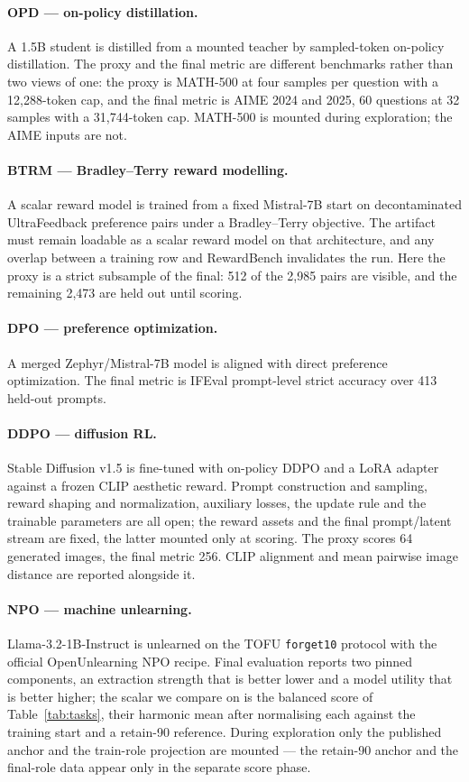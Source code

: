 \paragraph{OPD --- on-policy distillation.}
A 1.5B student is distilled from a mounted teacher by sampled-token on-policy distillation. The
proxy and the final metric are different benchmarks rather than two views of one: the proxy is
MATH-500 at four samples per question with a 12,288-token cap, and the final metric is AIME 2024 and
2025, 60 questions at 32 samples with a 31,744-token cap. MATH-500 is mounted during exploration;
the AIME inputs are not.

\paragraph{BTRM --- Bradley--Terry reward modelling.}
A scalar reward model is trained from a fixed Mistral-7B start on decontaminated UltraFeedback
preference pairs under a Bradley--Terry objective. The artifact must remain loadable as a scalar
reward model on that architecture, and any overlap between a training row and RewardBench
invalidates the run. Here the proxy is a strict subsample of the final: 512 of the 2,985 pairs are
visible, and the remaining 2,473 are held out until scoring.

\paragraph{DPO --- preference optimization.}
A merged Zephyr/Mistral-7B model is aligned with direct preference optimization. The final metric is
IFEval prompt-level strict accuracy over 413 held-out prompts.

\paragraph{DDPO --- diffusion RL.}
Stable Diffusion v1.5 is fine-tuned with on-policy DDPO and a LoRA adapter against a frozen CLIP
aesthetic reward. Prompt construction and sampling, reward shaping and normalization, auxiliary
losses, the update rule and the trainable parameters are all open; the reward assets and the final
prompt/latent stream are fixed, the latter mounted only at scoring. The proxy scores 64 generated
images, the final metric 256. CLIP alignment and mean pairwise image distance are reported alongside it.

\paragraph{NPO --- machine unlearning.}
Llama-3.2-1B-Instruct is unlearned on the TOFU \texttt{forget10} protocol with the official
OpenUnlearning NPO recipe. Final evaluation reports two pinned components, an extraction strength
that is better lower and a model utility that is better higher; the scalar we compare on is the
balanced score of Table~\ref{tab:tasks}, their harmonic mean after normalising each against the
training start and a retain-90 reference. During
exploration only the published anchor and the train-role projection are mounted --- the retain-90
anchor and the final-role data appear only in the separate score phase.

